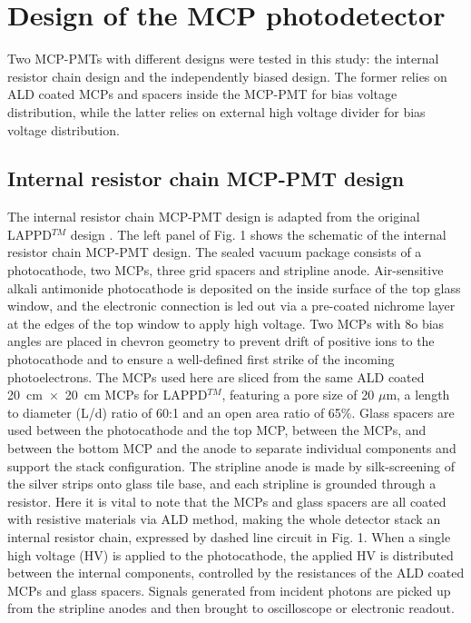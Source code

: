 \documentclass[preprint,5p]{elsarticle}
\begin{document}
\section{Design of the MCP photodetector} \label{sec_design}
Two MCP-PMTs with different designs were tested in this study: the internal 
resistor chain design and the independently biased design. The former relies on 
ALD coated MCPs and spacers inside the MCP-PMT for bias voltage distribution, 
while the latter relies on external high voltage divider for bias voltage 
distribution.  

\subsection{Internal resistor chain MCP-PMT design} \label{}
The internal resistor chain MCP-PMT design is adapted from the original LAPPD$^{TM}$ 
design \cite{17}. The left panel of Fig. 1 shows the schematic of the internal 
resistor chain MCP-PMT design. The sealed vacuum package consists of a 
photocathode, two MCPs, three grid spacers and stripline anode. Air-sensitive 
alkali antimonide photocathode is deposited on the inside surface of the top 
glass window, and the electronic connection is led out via a pre-coated 
nichrome layer at the edges of the top window to apply high voltage. Two MCPs 
with 8o bias angles are placed in chevron geometry to prevent drift of positive 
ions to the photocathode and to ensure a well-defined first strike of the 
incoming photoelectrons. The MCPs used here are sliced from the same ALD coated 
20~cm~$\times$~20~cm MCPs for LAPPD$^{TM}$, featuring a pore size of 20 $\mu$m, 
a length to diameter (L/d) ratio of 60:1 and an open area ratio of 65\%.  Glass 
spacers are used between the photocathode and the top MCP, between the MCPs, 
and between the bottom MCP and the anode to separate individual components and 
support the stack configuration. The stripline anode is made by silk-screening 
of the silver strips onto glass tile base, and each stripline is grounded 
through a resistor. Here it is vital to note that the MCPs and glass spacers 
are all coated with resistive materials via ALD method, making the whole 
detector stack an internal resistor chain, expressed by dashed line circuit in 
Fig. 1. When a single high voltage (HV) is applied to the photocathode, the 
applied HV is distributed between the internal components, controlled by the 
resistances of the ALD coated MCPs and glass spacers. Signals generated from 
incident photons are picked up from the stripline anodes and then brought to 
oscilloscope or electronic readout. 
\end{document}
